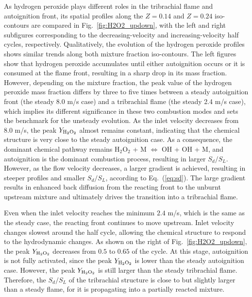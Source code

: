 As hydrogen peroxide plays different roles in the tribrachial flame and autoignition front, its spatial profiles along the $Z = 0.14$ and $Z = 0.24$ iso-contours are compared in Fig.~\ref{fig:H2O2_updown}, with the left and right subfigures corresponding to the decreasing-velocity and increasing-velocity half cycles, respectively.  Qualitatively, the evolution of the hydrogen peroxide profiles shows similar trends along both mixture fraction iso-contours.  The left figures show that hydrogen peroxide accumulates until either autoignition occurs or it is consumed at the flame front, resulting in a sharp drop in its mass fraction.  However, depending on the mixture fraction, the peak value of the hydrogen peroxide mass fraction differs by three to five times between a steady autoignition front (the steady 8.0 m/s case) and a tribrachial flame (the steady 2.4 m/s case), which implies its different significance in these two combustion modes and sets the benchmark for the unsteady evolution.  As the inlet velocity decreases from $8.0$ m/s, the peak $Y_{\rm H{_2}O{_2}}$ almost remains constant, indicating that the chemical structure is very close to the steady autoignition case.  As a consequence, the dominant chemical pathway remains H$_2$O$_2$ + M $\Longleftrightarrow$ OH + OH + M, and autoignition is the dominant combustion process, resulting in larger $S_d/S_L$.  However, as the flow velocity decreases, a larger gradient is achieved, resulting in steeper profiles and smaller $S_d/S_L$, according to Eq.~(\ref{eq:sd}).  The large gradient results in enhanced back diffusion from the reacting front to the unburnt upstream mixture and ultimately drives the transition into a tribrachial flame.

Even when the inlet velocity reaches the minimum $2.4$ m/s, which is the same as the steady case, the reacting front continues to move upstream.  Inlet velocity changes slowest around the half cycle, allowing the chemical structure to respond to the hydrodynamic changes.  As shown on the right of Fig.~\ref{fig:H2O2_updown}, the peak $Y_{\rm H{_2}O{_2}}$ decreases from $0.5$ to $0.65$ of the cycle.  At this stage, autoignition is not fully activated, since the peak $Y_{\rm H{_2}O{_2}}$ is lower than the steady autoignition case.  However, the peak $Y_{\rm H{_2}O{_2}}$ is still larger than the steady tribrachial flame.  Therefore, the $S_d/S_L$ of the tribrachial structure is close to but slightly larger than a steady flame, for it is propagating into a partially reacted mixture.  

